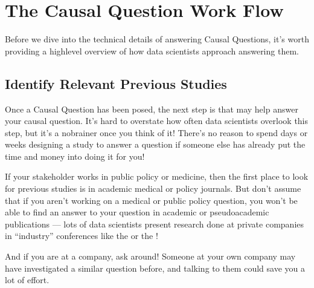 \documentclass[letterpaper,10pt,english]{jupyterBook}
\begin{document}
\section{The Causal Question Work Flow}
\label{\detokenize{30_questions/35_using_causal_questions:the-causal-question-work-flow}}
\sphinxAtStartPar
Before we dive into the technical details of answering Causal Questions, it’s worth providing a high\sphinxhyphen{}level overview of how data scientists approach answering them.


\subsection{Identify Relevant Previous Studies}
\label{\detokenize{30_questions/35_using_causal_questions:identify-relevant-previous-studies}}
\sphinxAtStartPar
Once a Causal Question has been posed, the next step is  that may help answer your causal question. It’s hard to overstate how often data scientists overlook this step, but it’s  a no\sphinxhyphen{}brainer once you think of it! There’s no reason to spend days or weeks designing a study to answer a question if someone else has already put the time and money into doing it for you!

\sphinxAtStartPar
If your stakeholder works in public policy or medicine, then the first place to look for previous studies is in academic medical or policy journals. But don’t assume that if you aren’t working on a medical or public policy question, you won’t be able to find an answer to your question in academic or pseudo\sphinxhyphen{}academic publications — lots of data scientists present research done at private companies in “industry” conferences like the  or the !

\sphinxAtStartPar
And if you are at a company, ask around! Someone at your own company may have investigated a similar question before, and talking to them could save you a lot of effort.
\end{document}
